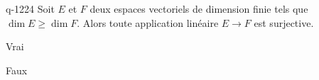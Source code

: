 \begin{truefalse}{q-1224}
Soit $E$ et $F$ deux espaces vectoriels de dimension finie tels que $\dim E \geq \dim F$. Alors toute application linéaire $E \to F$ est surjective.
\item Vrai
\item* Faux
\end{truefalse}

